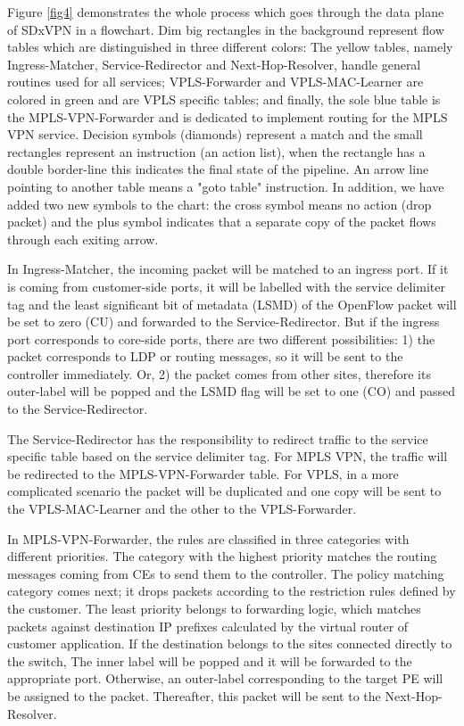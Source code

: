 \documentclass[10pt,conference]{IEEEtran}
\begin{document}
Figure \ref{fig4} demonstrates the whole process which goes through the data plane of SDxVPN in a flowchart. Dim big rectangles in the background represent flow tables which are distinguished in three different colors: The yellow tables, namely Ingress-Matcher, Service-Redirector and Next-Hop-Resolver, handle general routines used for all services; VPLS-Forwarder and VPLS-MAC-Learner are colored in green and are VPLS specific tables; and finally, the sole blue table is the MPLS-VPN-Forwarder and is dedicated to implement routing for the MPLS VPN service.  Decision symbols (diamonds) represent a match and the small rectangles represent an instruction (an action list), when the rectangle has a double border-line this indicates the final state of the pipeline. An arrow line pointing to another table means a "goto table" instruction. In addition, we have added two new symbols to the chart: the cross symbol means no action (drop packet) and the plus symbol indicates that a separate copy of the packet flows through each exiting arrow.

In Ingress-Matcher, the incoming packet will be matched to an ingress port. If it is coming from customer-side ports, it will be labelled with the service delimiter tag and the least significant bit of metadata (LSMD) of the OpenFlow packet will be set to zero (CU) and forwarded to the Service-Redirector. But if the ingress port corresponds to core-side ports, there are two different possibilities: 1) the packet corresponds to LDP or routing messages, so it will be sent to the controller immediately. Or, 2) the packet comes from other sites, therefore its  outer-label will be popped and the LSMD flag will be set to one (CO) and passed to the Service-Redirector. 

The Service-Redirector has the responsibility to redirect traffic to the service specific table based on the service delimiter tag. For MPLS VPN, the traffic will be redirected to the MPLS-VPN-Forwarder table. For VPLS, in a more complicated scenario the packet will be duplicated and one copy will be sent to the VPLS-MAC-Learner and the other to the VPLS-Forwarder.

In MPLS-VPN-Forwarder, the rules are classified in three categories with different priorities. The category with the highest priority matches the routing messages coming from CEs to send them to the controller. The policy matching category comes next; it drops packets according to the restriction rules defined by the customer. The least priority belongs to forwarding logic, which matches packets against destination IP prefixes calculated by the virtual router of customer application. If the destination belongs to the sites connected directly to the switch, The inner label will be popped and it will be forwarded to the appropriate port. Otherwise, an outer-label  corresponding to the target PE will be assigned to the packet. Thereafter,  this packet will be sent to the Next-Hop-Resolver.
\end{document}
